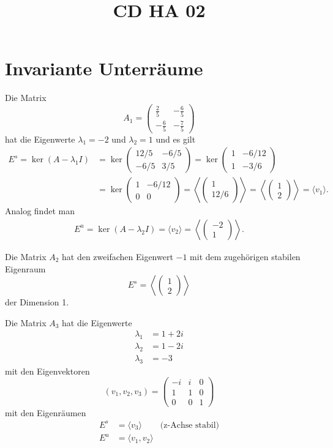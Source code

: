 \documentclass[a4paper]{article}
\title{CD HA 02}
\begin{document}
\section{Invariante Unterräume}
Die Matrix
$$A_1 = \begin{pmatrix}
\frac{2}{5} & -\frac{6}{5} \\
-\frac{6}{5} & -\frac{7}{5}
\end{pmatrix}$$
hat die Eigenwerte $λ_1 = -2$ und $λ_2 = 1$ und es gilt
\begin{align*}
E^s = \ker (A - λ_1 I) &= \ker \begin{pmatrix}
12/5 & -6/5 \\ -6/5 & 3/5
\end{pmatrix} = \ker \begin{pmatrix}
1 & -6/12 \\ 1 & -3/6
\end{pmatrix}\\
&=\ker\begin{pmatrix}
1 & -6/12\\
0 & 0
\end{pmatrix} = \left\langle \begin{pmatrix}
1 \\ 12/6
\end{pmatrix} \right\rangle  
= \left\langle \begin{pmatrix}
1 \\ 2
\end{pmatrix} \right\rangle = \langle v_1 \rangle.
\end{align*}
Analog findet man
\begin{align*}
E^u = \ker (A -λ_2 I) = \langle v_2 \rangle = \left\langle \begin{pmatrix}
-2\\ 1
\end{pmatrix}\right\rangle.
\end{align*}

Die Matrix $A_2$ hat den zweifachen Eigenwert $-1$ mit dem zugehörigen stabilen Eigenraum 
$$
E^s = \left \langle \begin{pmatrix}
1\\ 2
\end{pmatrix}
\right\rangle$$
der Dimension 1.

Die Matrix $A_3$ hat die Eigenwerte 
\begin{align*}
    λ_1 &= 1 + 2i\\
    λ_2 &= 1 - 2i\\
    λ_3 &= -3
\end{align*}
mit den Eigenvektoren
$$
(v_1, v_2, v_3) =\begin{pmatrix}
-i & i & 0\\
1 & 1 & 0\\
0 & 0 & 1
\end{pmatrix}
$$
mit den Eigenräumen
\begin{align*}
E^s &= \langle v_3 \rangle &\text{(z-Achse stabil)}\\
E^u &= \langle v_1, v_2 \rangle
\end{align*}
\end{document}
